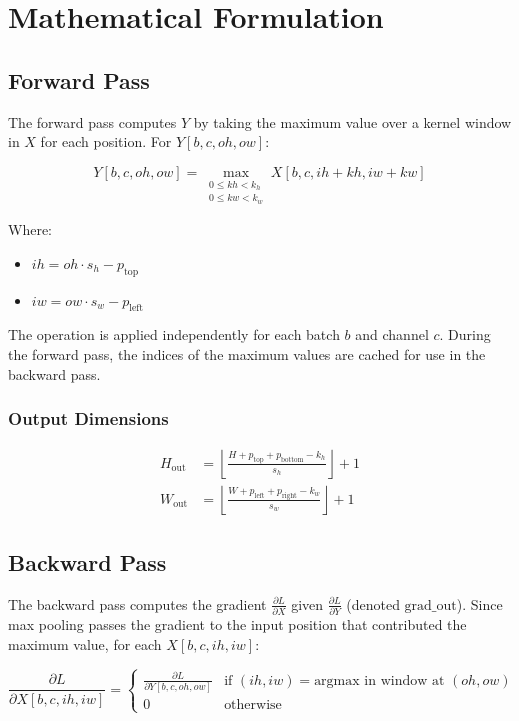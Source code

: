 \documentclass{article}
\begin{document}
\section{Mathematical Formulation}

\subsection{Forward Pass}
The forward pass computes $Y$ by taking the maximum value over a kernel window in $X$ for each position. For $Y[b, c, oh, ow]$:

\begin{equation}
Y[b, c, oh, ow] = \max_{\substack{0 \leq kh < k_h \\ 0 \leq kw < k_w}} X[b, c, ih + kh, iw + kw]
\end{equation}

Where:
\begin{itemize}
    \item $ih = oh \cdot s_h - p_{\text{top}}$
    \item $iw = ow \cdot s_w - p_{\text{left}}$
\end{itemize}

The operation is applied independently for each batch $b$ and channel $c$. During the forward pass, the indices of the maximum values are cached for use in the backward pass.

\subsubsection{Output Dimensions}
\begin{align}
H_{\text{out}} &= \left\lfloor \frac{H + p_{\text{top}} + p_{\text{bottom}} - k_h}{s_h} \right\rfloor + 1 \\
W_{\text{out}} &= \left\lfloor \frac{W + p_{\text{left}} + p_{\text{right}} - k_w}{s_w} \right\rfloor + 1
\end{align}

\subsection{Backward Pass}
The backward pass computes the gradient $\frac{\partial L}{\partial X}$ given $\frac{\partial L}{\partial Y}$ (denoted $\text{grad_out}$). Since max pooling passes the gradient to the input position that contributed the maximum value, for each $X[b, c, ih, iw]$:

\begin{equation}
\frac{\partial L}{\partial X[b, c, ih, iw]} = 
\begin{cases} 
\frac{\partial L}{\partial Y[b, c, oh, ow]} & \text{if } (ih, iw) = \text{argmax in window at } (oh, ow) \\
0 & \text{otherwise}
\end{cases}
\end{equation}
\end{document}
